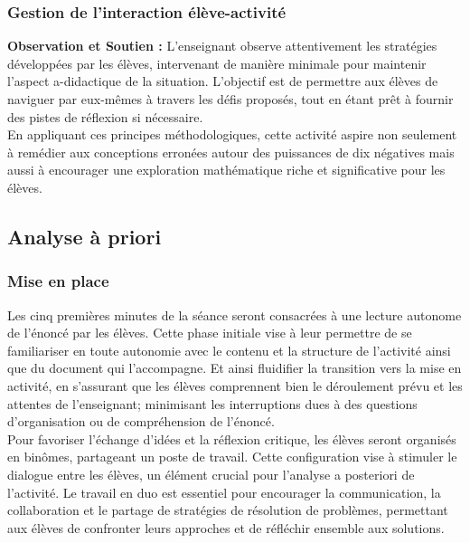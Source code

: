 \subsubsection{Gestion de l'interaction élève-activité}

\textbf{Observation et Soutien :}
L'enseignant observe attentivement les stratégies développées par les élèves,
intervenant de manière minimale pour maintenir l'aspect a-didactique de la situation.
L'objectif est de permettre aux élèves de naviguer par eux-mêmes à travers les défis proposés,
tout en étant prêt à fournir des pistes de réflexion si nécessaire.\\

En appliquant ces principes méthodologiques,
cette activité aspire non seulement à remédier aux conceptions erronées autour des puissances de dix négatives mais aussi à encourager une exploration mathématique riche et significative pour les élèves.

\subsection{Analyse à priori}

\subsubsection{Mise en place}

Les cinq premières minutes de la séance seront consacrées à une lecture autonome de l'énoncé par les élèves.
Cette phase initiale vise à leur permettre de se familiariser en toute autonomie avec le contenu et la structure de l'activité ainsi que du document qui l'accompagne.
Et ainsi fluidifier la transition vers la mise en activité,
en s'assurant que les élèves comprennent bien le déroulement prévu et les attentes de l'enseignant;
minimisant les interruptions dues à des questions d'organisation ou de compréhension de l'énoncé.\\

Pour favoriser l'échange d'idées et la réflexion critique,
les élèves seront organisés en binômes,
partageant un poste de travail.
Cette configuration vise à stimuler le dialogue entre les élèves,
un élément crucial pour l'analyse a posteriori de l'activité.
Le travail en duo est essentiel pour encourager la communication,
la collaboration et le partage de stratégies de résolution de problèmes,
permettant aux élèves de confronter leurs approches et de réfléchir ensemble aux solutions.\\

